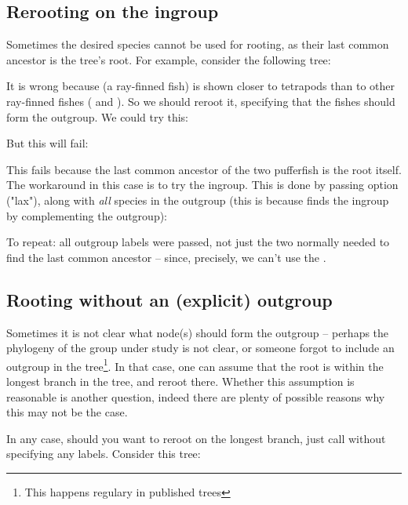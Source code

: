 \subsection{Rerooting on the ingroup}

Sometimes the desired species cannot be used for rooting, as their last common ancestor is the tree's root. For example, consider the following tree:


It is wrong because  (a ray-finned fish) is shown
closer to tetrapods than to other ray-finned fishes ( and
). So we should reroot it, specifying that the fishes should
form the outgroup. We could try this:


But this will fail:


This fails because the last common ancestor of the two pufferfish is
the root itself. The workaround in this case is to try the ingroup. This is
done by passing option  ("lax"), along with {\em all} species in
the outgroup (this is because \reroot{} finds the ingroup by complementing the
outgroup):


To repeat: all outgroup labels were passed, not just the two
normally needed to find the last common ancestor -- since, precisely, we can't
use the \lca.

\subsection[sct:no-outgroup]{Rooting without an (explicit) outgroup}


Sometimes it is not clear what node(s) should form the outgroup --
perhaps the phylogeny of the group under study is not clear, or someone forgot
to include an outgroup in the tree\footnote{This happens regulary in published
trees}. In that case, one can assume that the root is within the longest branch
in the tree, and reroot there. Whether this assumption is reasonable is another
question, indeed there are plenty of possible reasons why this may not be the
case.

In any case, should you want to reroot on the longest branch, just call
\reroot{} without specifying any labels. Consider this tree:
\startalignment[center]
\stopalignment

